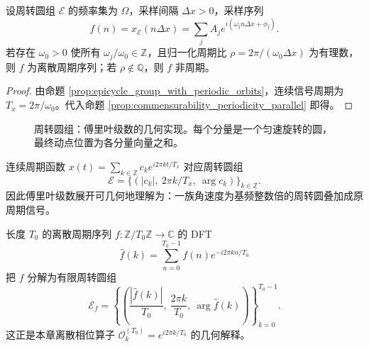 \begin{proposition}[周转圆组的采样与公度性]\label{prop:epicycle_sampling_commensurability}
设周转圆组 $\mathcal{E}$ 的频率集为 $\Omega$，采样间隔 $\Delta x>0$，采样序列
\[
f(n)=x_{\mathcal{E}}(n\Delta x)=\sum_j A_j e^{i(\omega_j n\Delta x+\phi_j)}.
\]
若存在 $\omega_0>0$ 使所有 $\omega_j/\omega_0\in\mathbb{Z}$，且归一化周期比 $\rho=2\pi/(\omega_0\Delta x)$ 为有理数，则 $f$ 为离散周期序列；若 $\rho\notin\mathbb{Q}$，则 $f$ 非周期。
\end{proposition}

\begin{proof}
由命题 \ref{prop:epicycle_group_with_periodic_orbits}，连续信号周期为 $T_x=2\pi/\omega_0$。代入命题 \ref{prop:commensurability_periodicity_parallel} 即得。
\end{proof}

\begin{figure}[htbp]
\centering
{}
\caption{周转圆组：傅里叶级数的几何实现。每个分量是一个匀速旋转的圆，最终动点位置为各分量向量之和。}
\label{fig:epicycle_system}
\end{figure}

\begin{example}[傅里叶级数就是周转圆组]\label{ex:fourier_epicycle}
连续周期函数 $x(t)=\sum_{k\in\mathbb{Z}}c_k e^{i2\pi kt/T_x}$ 对应周转圆组
\[
\mathcal{E}=\{(|c_k|,\ 2\pi k/T_x,\ \arg c_k)\}_{k\in\mathbb{Z}}.
\]
因此傅里叶级数展开可几何地理解为：一族角速度为基频整数倍的周转圆叠加成原周期信号。
\end{example}

\begin{example}[离散傅里叶变换是有限周转圆组]\label{ex:dft_epicycle}
长度 $T_0$ 的离散周期序列 $f:\mathbb{Z}/T_0\mathbb{Z}\to\mathbb{C}$ 的 DFT
\[
\hat f(k)=\sum_{n=0}^{T_0-1}f(n)e^{-i2\pi kn/T_0}
\]
把 $f$ 分解为有限周转圆组
\[
\mathcal{E}_f=\left\{\left(\frac{|\hat f(k)|}{T_0},\ \frac{2\pi k}{T_0},\ \arg \hat f(k)\right)\right\}_{k=0}^{T_0-1}.
\]
这正是本章离散相位算子 $\mathcal{O}_k^{(T_0)}=e^{i2\pi k/T_0}$ 的几何解释。
\end{example}

